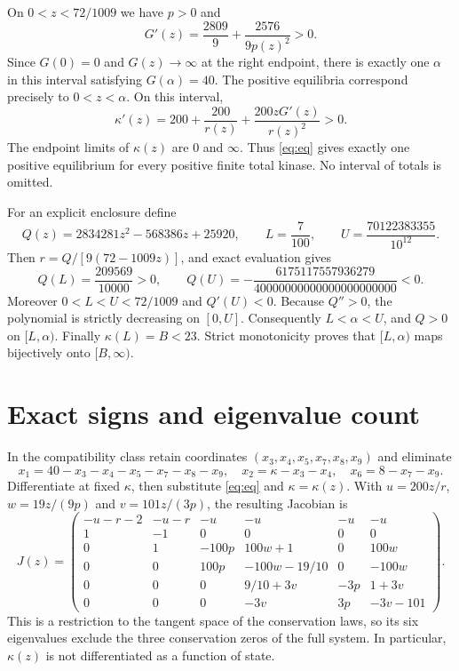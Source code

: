 \documentclass[11pt]{article}
\begin{document}
On $0<z<72/1009$ we have $p>0$ and
\[
 G'(z)=\frac{2809}{9}+\frac{2576}{9p(z)^2}>0.
\]
Since $G(0)=0$ and $G(z)\to\infty$ at the right endpoint, there is exactly
one $\alpha$ in this interval satisfying $G(\alpha)=40$.
The positive equilibria correspond precisely to $0<z<\alpha$.
On this interval,
\[
 \kappa'(z)=200+\frac{200}{r(z)}
                 +\frac{200zG'(z)}{r(z)^2}>0.
\]
The endpoint limits of $\kappa(z)$ are $0$ and $\infty$.
Thus \eqref{eq:eq} gives exactly one positive equilibrium for every positive
finite total kinase. No interval of totals is omitted.

For an explicit enclosure define
\begin{equation}\label{eq:interval}
 Q(z)=2834281z^2-568386z+25920,\qquad
 L=\frac7{100},\qquad U=\frac{70122383355}{10^{12}}.
\end{equation}
Then $r=Q/[9(72-1009z)]$, and exact evaluation gives
\[
 Q(L)=\frac{209569}{10000}>0,\qquad
 Q(U)=-\frac{6175117557936279}{40000000000000000000000}<0.
\]
Moreover $0<L<U<72/1009$ and $Q'(U)<0$.
Because $Q''>0$, the polynomial is strictly decreasing on $[0,U]$.
Consequently $L<\alpha<U$, and $Q>0$ on $[L,\alpha)$.
Finally $\kappa(L)=B<23$. Strict monotonicity proves that
$[L,\alpha)$ maps bijectively onto $[B,\infty)$.

\section{Exact signs and eigenvalue count}

In the compatibility class retain coordinates
$(x_3,x_4,x_5,x_7,x_8,x_9)$ and eliminate
\[
 x_1=40-x_3-x_4-x_5-x_7-x_8-x_9,\quad
 x_2=\kappa-x_3-x_4,\quad x_6=8-x_7-x_9.
\]
Differentiate at fixed $\kappa$, then substitute \eqref{eq:eq} and
$\kappa=\kappa(z)$. With $u=200z/r$, $w=19z/(9p)$ and $v=101z/(3p)$,
the resulting Jacobian is
\begin{equation}\label{eq:jac}
 J(z)=\begin{pmatrix}
 -u-r-2&-u-r&-u&-u&-u&-u\\
 1&-1&0&0&0&0\\
 0&1&-100p&100w+1&0&100w\\
 0&0&100p&-100w-19/10&0&-100w\\
 0&0&0&9/10+3v&-3p&1+3v\\
 0&0&0&-3v&3p&-3v-101
 \end{pmatrix}.
\end{equation}
This is a restriction to the tangent space of the conservation laws, so its
six eigenvalues exclude the three conservation zeros of the full system.
In particular, $\kappa(z)$ is not differentiated as a function of state.
\end{document}
